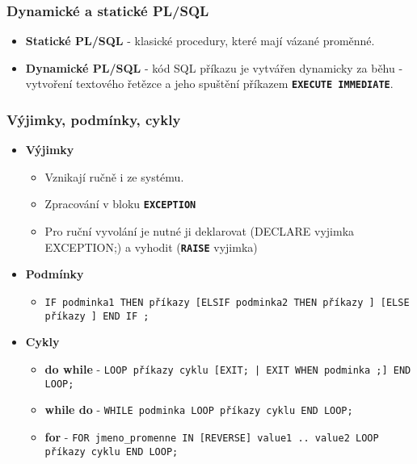 \subsubsection{Dynamické a statické PL/SQL}
\begin{itemize}
\item \textbf{Statické PL/SQL} - klasické procedury, které mají vázané proměnné.
\item \textbf{Dynamické PL/SQL} - kód SQL příkazu je vytvářen dynamicky za běhu - vytvoření textového řetězce a jeho spuštění příkazem \textbf{\texttt{EXECUTE IMMEDIATE}}.
\end{itemize}

\subsubsection{Výjimky, podmínky, cykly}
\begin{itemize}
\item \textbf{Výjimky}
\begin{itemize}
\item Vznikají ručně i ze systému.
\item Zpracování v bloku \texttt{\textbf{EXCEPTION}}
\item Pro ruční vyvolání je nutné ji deklarovat (DECLARE vyjimka EXCEPTION;) a vyhodit (\textbf{\texttt{RAISE}} vyjimka)
\end{itemize}
\item \textbf{Podmínky}
\begin{itemize}
\item \texttt{IF podminka1 THEN příkazy [ELSIF podminka2 THEN příkazy ] [ELSE příkazy ] END IF ;}
\end{itemize}
\item \textbf{Cykly}
\begin{itemize}
\item \textbf{do while} - \texttt{LOOP příkazy cyklu [EXIT; | EXIT WHEN podminka ;] END LOOP;}
\item \textbf{while do} - \texttt{WHILE podminka LOOP příkazy cyklu END LOOP;}
\item \textbf{for} - \texttt{FOR jmeno\_promenne IN [REVERSE] value1 .. value2 LOOP příkazy cyklu END LOOP;}
\end{itemize}
\end{itemize}


